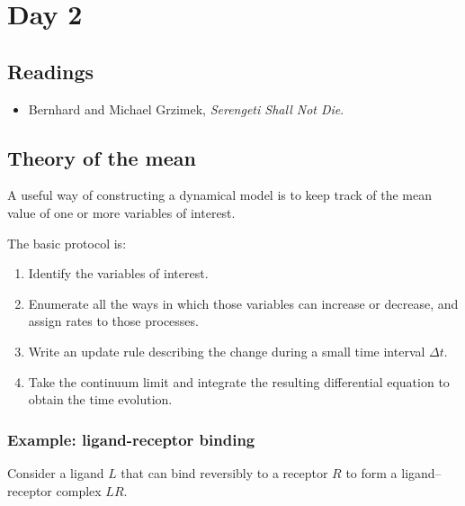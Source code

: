 \section{Day 2}

\subsection{Readings}

\begin{itemize}
    \item Bernhard and Michael Grzimek, \textit{Serengeti Shall Not Die}.
\end{itemize}



\subsection{Theory of the mean}

A useful way of constructing a dynamical model is to keep track of the mean value of one or more variables of interest.

The basic protocol is:

\begin{enumerate}
    \item Identify the variables of interest.
    \item Enumerate all the ways in which those variables can increase or decrease, and assign rates to those processes.
    \item Write an update rule describing the change during a small time interval $\Delta t$.
    \item Take the continuum limit and integrate the resulting differential equation to obtain the time evolution.
\end{enumerate}


\subsubsection{Example: ligand-receptor binding}

Consider a ligand $L$ that can bind reversibly to a receptor $R$ to form a ligand--receptor complex $LR$.

